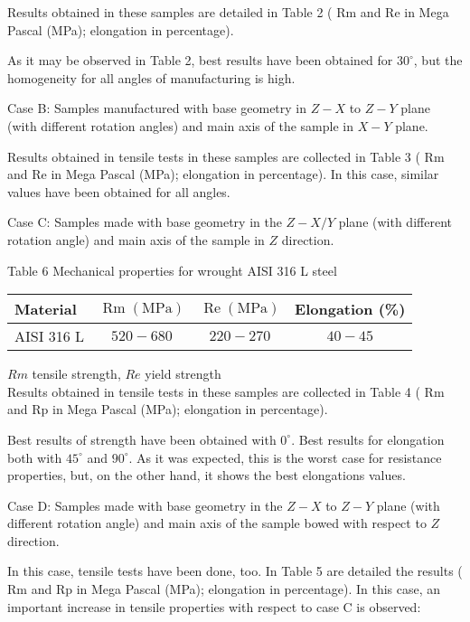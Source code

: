 \documentclass[10pt]{article}
\begin{document}
Results obtained in these samples are detailed in Table 2 ( $\mathrm{Rm}$ and $\mathrm{Re}$ in Mega Pascal (MPa); elongation in percentage).

As it may be observed in Table 2, best results have been obtained for $30^{\circ}$, but the homogeneity for all angles of manufacturing is high.

Case B: Samples manufactured with base geometry in $Z-X$ to $Z-Y$ plane (with different rotation angles) and main axis of the sample in $X-Y$ plane.

Results obtained in tensile tests in these samples are collected in Table 3 ( $\mathrm{Rm}$ and Re in Mega Pascal (MPa); elongation in percentage). In this case, similar values have been obtained for all angles.

Case C: Samples made with base geometry in the $Z-X / Y$ plane (with different rotation angle) and main axis of the sample in $Z$ direction.

Table 6 Mechanical properties for wrought AISI 316 L steel

\begin{center}
\begin{tabular}{lccc}
\hline
Material & $\operatorname{Rm}(\mathrm{MPa})$ & $\operatorname{Re}(\mathrm{MPa})$ & Elongation (\%) \\
\hline
AISI 316 L & $520-680$ & $220-270$ & $40-45$ \\
\hline
\end{tabular}
\end{center}

$R m$ tensile strength, $R e$ yield strength\\
Results obtained in tensile tests in these samples are collected in Table 4 ( $\mathrm{Rm}$ and $\mathrm{Rp}$ in Mega Pascal (MPa); elongation in percentage).

Best results of strength have been obtained with $0^{\circ}$. Best results for elongation both with $45^{\circ}$ and $90^{\circ}$. As it was expected, this is the worst case for resistance properties, but, on the other hand, it shows the best elongations values.

Case D: Samples made with base geometry in the $Z-X$ to $Z-Y$ plane (with different rotation angle) and main axis of the sample bowed with respect to $Z$ direction.

In this case, tensile tests have been done, too. In Table 5 are detailed the results ( $\mathrm{Rm}$ and $\mathrm{Rp}$ in Mega Pascal (MPa); elongation in percentage). In this case, an important increase in tensile properties with respect to case $\mathrm{C}$ is observed:
\end{document}
